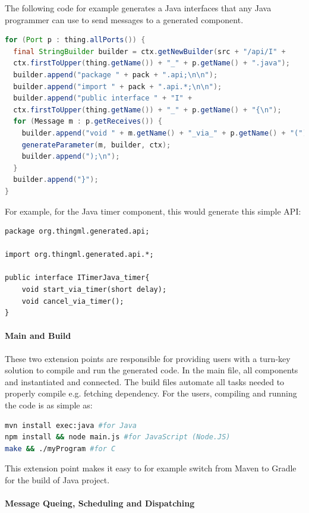 The following code for example generates a Java interfaces that any Java programmer can use to send messages to a generated component. 

\begin{lstlisting}[language=Java]
for (Port p : thing.allPorts()) { 
  final StringBuilder builder = ctx.getNewBuilder(src + "/api/I" +    
  ctx.firstToUpper(thing.getName()) + "_" + p.getName() + ".java"); 
  builder.append("package " + pack + ".api;\n\n"); 
  builder.append("import " + pack + ".api.*;\n\n"); 
  builder.append("public interface " + "I" +  
  ctx.firstToUpper(thing.getName()) + "_" + p.getName() + "{\n"); 
  for (Message m : p.getReceives()) { 
    builder.append("void " + m.getName() + "_via_" + p.getName() + "("); 
    generateParameter(m, builder, ctx); 
    builder.append(");\n"); 
  } 
  builder.append("}"); 
}
\end{lstlisting}

For example, for the Java timer component, this would generate this simple API: 


\begin{lstlisting}
package org.thingml.generated.api; 

import org.thingml.generated.api.*; 

public interface ITimerJava_timer{ 
	void start_via_timer(short delay); 
	void cancel_via_timer(); 
}
	\end{lstlisting}

\paragraph{Main and Build}

These two extension points are responsible for providing users with a turn-key solution to compile and run the generated code. In the main file, all components and instantiated and connected. The build files automate all tasks needed to properly compile e.g. fetching dependency. For the users, compiling and running the code is as simple as: 

\begin{lstlisting}[language=bash]
mvn install exec:java #for Java 
npm install && node main.js #for JavaScript (Node.JS)
make && ./myProgram #for C 
\end{lstlisting}

This extension point makes it easy to for example switch from Maven to Gradle for the build of Java project. 

\paragraph{Message Queing, Scheduling and Dispatching}

